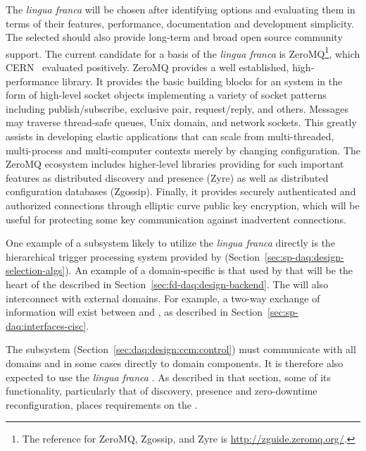 The \textit{lingua franca}  will be chosen after identifying options and evaluating them in terms of their features, performance, documentation and development simplicity. 
The selected  should also provide %
 long-term and broad open source community support. 
The current candidate for a basis of the \textit{lingua franca}  is ZeroMQ\footnote{The reference for ZeroMQ, Zgossip, and Zyre is \url{http://zguide.zeromq.org/}.},
which CERN~\cite{Dworak:2012mf} evaluated positively. 
ZeroMQ provides a well established, high-performance library. 
It provides the basic building blocks for an  system in the form of high-level socket objects implementing a variety of socket patterns including publish/subscribe, exclusive pair, request/reply, and others. 
Messages may %
traverse thread-safe queues, Unix domain, and network sockets. This greatly assists in developing elastic applications that can scale from multi-threaded, multi-process and multi-computer contexts merely by changing configuration. 
The ZeroMQ ecosystem includes higher-level libraries providing for such important features as distributed discovery and presence (Zyre) as well as distributed configuration databases (Zgossip). 
Finally, it provides securely authenticated and authorized connections through elliptic curve public key encryption, which will be useful for protecting some key communication against inadvertent connections. 

One example of a subsystem likely to utilize the \textit{lingua franca}  directly is the hierarchical trigger processing system provided by  (Section~\ref{sec:sp-daq:design-selection-algs}).
An example of a domain-specific  is that used by  that will be the heart of the  %
described in Section~\ref{sec:fd-daq:design-backend}.
The  will also interconnect with external domains. 
For example, a two-way exchange of information will exist between  and , as described in Section~\ref{sec:sp-daq:interfaces-cisc}.  

The  subsystem (Section~\ref{sec:daq:design:ccm:control}) must communicate with all  domains and in some cases directly to domain components. It is therefore %
also expected to use the \textit{lingua franca} . 
As described in that section, some of its functionality, particularly that of discovery, presence and zero-downtime reconfiguration, places requirements on the .

